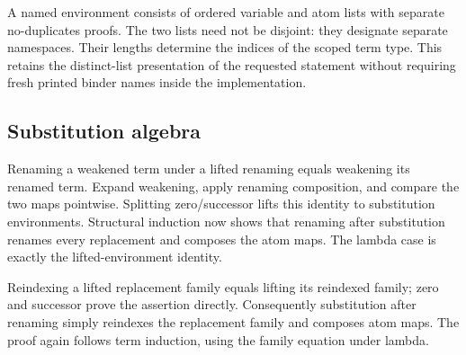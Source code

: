 




A named environment consists of ordered variable and atom lists with separate
no-duplicates proofs. The two lists need not be disjoint: they designate separate
namespaces. Their lengths determine the indices of the scoped term type.
This retains the distinct-list presentation of the requested statement without
requiring fresh printed binder names inside the implementation.


\subsection{Substitution algebra}

Renaming a weakened term under a lifted renaming equals weakening its renamed
term. Expand weakening, apply renaming composition, and compare the two maps
pointwise. Splitting zero/successor lifts this identity to substitution
environments. Structural induction now shows that renaming after substitution
renames every replacement and composes the atom maps. The lambda case is
exactly the lifted-environment identity.




Reindexing a lifted replacement family equals lifting its reindexed family;
zero and successor prove the assertion directly. Consequently substitution
after renaming simply reindexes the replacement family and composes atom maps.
The proof again follows term induction, using the family equation under lambda.



